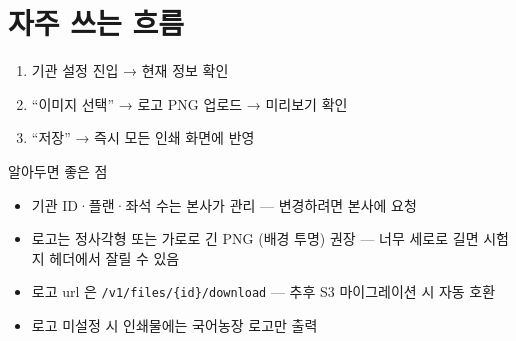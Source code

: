 \section*{자주 쓰는 흐름}
\begin{enumerate}
  \item 기관 설정 진입 → 현재 정보 확인
  \item ``이미지 선택'' → 로고 PNG 업로드 → 미리보기 확인
  \item ``저장'' → 즉시 모든 인쇄 화면에 반영
\end{enumerate}

\begin{tipbox}{알아두면 좋은 점}
\begin{itemize}[leftmargin=1.2em]
  \item 기관 ID·플랜·좌석 수는 본사가 관리 — 변경하려면 본사에 요청
  \item 로고는 정사각형 또는 가로로 긴 PNG (배경 투명) 권장 — 너무 세로로 길면 시험지 헤더에서 잘릴 수 있음
  \item 로고 url 은 \texttt{/v1/files/\{id\}/download} — 추후 S3 마이그레이션 시 자동 호환
  \item 로고 미설정 시 인쇄물에는 국어농장 로고만 출력
\end{itemize}
\end{tipbox}

